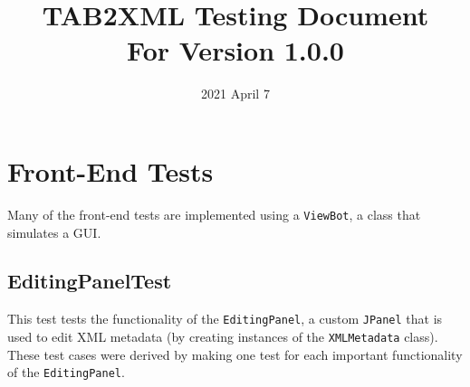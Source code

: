\documentclass[11pt]{article}
\date{2021 April 7}
\title{TAB2XML Testing Document\\\medskip
\large For Version 1.0.0}
\begin{document}
\maketitle
\tableofcontents

\newpage

\section{Front-End Tests}
\label{sec:orgd9b1a43}
Many of the front-end tests are implemented using a \texttt{ViewBot}, a class that simulates a GUI.
\subsection{EditingPanelTest}
\label{sec:orgf539d82}
This test tests the functionality of the \texttt{EditingPanel}, a custom \texttt{JPanel} that is used to edit XML metadata (by creating instances of the \texttt{XMLMetadata} class).  These test cases were derived by making one test for each important functionality of the \texttt{EditingPanel}.
\end{document}

